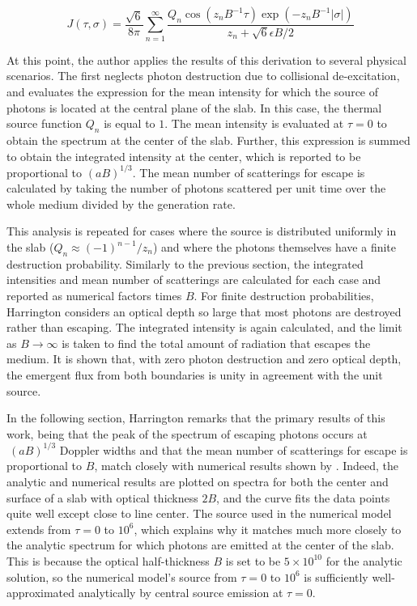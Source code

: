 \documentclass[onecolumn]{aastex63}
\begin{document}
\begin{equation}
    J(\tau, \sigma) = \frac{\sqrt{6}}{8\pi} \sum_{n=1}^{\infty} \frac{Q_n \cos(z_n B^{-1}\tau)\exp(-z_n B^{-1}|\sigma|)}{z_n + \sqrt{6}\epsilon B / 2}
\end{equation}

At this point, the author applies the results of this derivation to several physical scenarios. The first neglects photon destruction due to collisional de-excitation, and evaluates the expression for the mean intensity for which the source of photons is located at the central plane of the slab. In this case, the thermal source function $Q_n$ is equal to $1$. The mean intensity is evaluated at $\tau=0$ to obtain the spectrum at the center of the slab. Further, this expression is summed to obtain the integrated intensity at the center, which is reported to be proportional to $(aB)^{1/3}$. The mean number of scatterings for escape is calculated by taking the number of photons scattered per unit time over the whole medium divided by the generation rate. 

This analysis is repeated for cases where the source is distributed uniformly in the slab ($Q_n \approx (-1)^{n-1}/z_n$) and where the photons themselves have a finite destruction probability. Similarly to the previous section, the integrated intensities and mean number of scatterings are calculated for each case and reported as numerical factors times $B$. For finite destruction probabilities, Harrington considers an optical depth so large that most photons are destroyed rather than escaping. The integrated intensity is again calculated, and the limit as $B\rightarrow\infty$ is taken to find the total amount of radiation that escapes the medium. It is shown that, with zero photon destruction and zero optical depth, the emergent flux from both boundaries is unity in agreement with the unit source.

In the following section, Harrington remarks that the primary results of this work, being that the peak of the spectrum of escaping photons occurs at $~(aB)^{1/3}$ Doppler widths and that the mean number of scatterings for escape is proportional to $B$, match closely with numerical results shown by \cite{1972ApJ...174..439A}. Indeed, the analytic and numerical results are plotted on spectra for both the center and surface of a slab with optical thickness $2B$, and the curve fits the data points quite well except close to line center. The source used in the numerical model extends from $\tau=0$ to $10^6$, which explains why it matches much more closely to the analytic spectrum for which photons are emitted at the center of the slab. This is because the optical half-thickness $B$ is set to be $5\times10^{10}$ for the analytic solution, so the numerical model's source from $\tau=0$ to $10^6$ is sufficiently well-approximated analytically by central source emission at $\tau=0$.
\end{document}
